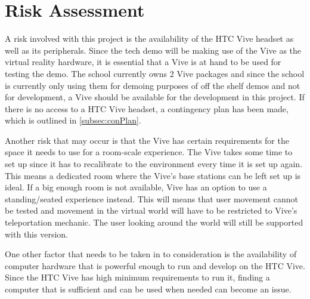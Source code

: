 \section{Risk Assessment}
A risk involved with this project is the availability of the HTC Vive headset as well as its peripherals. Since the tech demo will be making use of the Vive as the virtual reality hardware, it is essential that a Vive is at hand to be used for testing the demo. The school currently owns 2 Vive packages and since the school is currently only using them for demoing purposes of off the shelf demos and not for development, a Vive should be available for the development in this project. If there is no access to a HTC Vive headset, a contingency plan has been made, which is outlined in \ref{subsec:conPlan}.
\newline
\par
Another risk that may occur is that the Vive has certain requirements for the space it needs to use for a room-scale experience. The Vive takes some time to set up since it has to recalibrate to the environment every time it is set up again. This means a dedicated room where the Vive's base stations can be left set up is ideal. If a big enough room is not available, Vive has an option to use a standing/seated experience instead. This will means that user movement cannot be tested and movement in the virtual world will have to be restricted to Vive’s teleportation mechanic. The user looking around the world will still be supported with this version.
\newline
\par
One other factor that needs to be taken in to consideration is the availability of computer hardware that is powerful enough to run and develop on the HTC Vive. Since the HTC Vive has high minimum requirements to run it, finding a computer that is sufficient and can be used when needed can become an issue.

